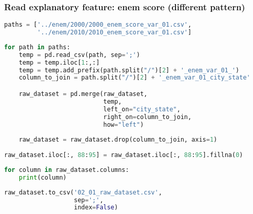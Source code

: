 \hypertarget{read-explanatory-feature-enem-score-different-pattern}{%
\subsubsection{Read explanatory feature: enem score (different
pattern)}\label{read-explanatory-feature-enem-score-different-pattern}}

\begin{lstlisting}[language=Python]
paths = ['../enem/2000/2000_enem_score_var_01.csv',
         '../enem/2010/2010_enem_score_var_01.csv']
\end{lstlisting}

\begin{lstlisting}[language=Python]
for path in paths:
    temp = pd.read_csv(path, sep=';')
    temp = temp.iloc[1:,:]
    temp = temp.add_prefix(path.split("/")[2] + '_enem_var_01_')
    column_to_join = path.split("/")[2] + '_enem_var_01_city_state'

    raw_dataset = pd.merge(raw_dataset,
                           temp,
                           left_on="city_state",
                           right_on=column_to_join,
                           how="left")
    
    raw_dataset = raw_dataset.drop(column_to_join, axis=1)
    
raw_dataset.iloc[:, 88:95] = raw_dataset.iloc[:, 88:95].fillna(0)
\end{lstlisting}

\begin{lstlisting}[language=Python]
for column in raw_dataset.columns:
    print(column)
\end{lstlisting}

\begin{lstlisting}[language=Python]
raw_dataset.to_csv('02_01_raw_dataset.csv',
                   sep=';',
                   index=False)
\end{lstlisting}


